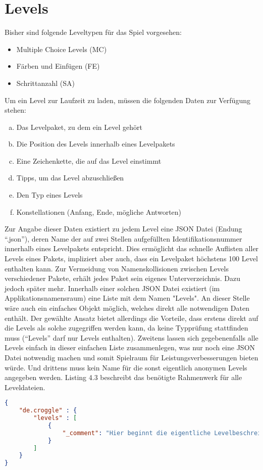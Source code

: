 \section{Levels}
Bisher sind folgende Leveltypen für das Spiel vorgesehen:
\begin{itemize}
	\item Multiple Choice Levels (MC)
	\item Färben und Einfügen (FE)
	\item Schrittanzahl (SA)
\end{itemize}
Um ein Level zur Laufzeit zu laden, müssen die folgenden Daten zur Verfügung stehen:
\begin{enumerate}[a)]
	\item Das Levelpaket, zu dem ein Level gehört
	\item Die Position des Levels innerhalb eines Levelpakets
	\item Eine Zeichenkette, die auf das Level einstimmt
	\item Tipps, um das Level abzuschließen
	\item Den Typ eines Levels
	\item Konstellationen (Anfang, Ende, mögliche Antworten)
\end{enumerate}
Zur Angabe dieser Daten existiert zu jedem Level eine JSON Datei (Endung "`.json"'), deren Name der auf zwei Stellen aufgefüllten Identifikationsnummer innerhalb eines Levelpakets entspricht.
Dies ermöglicht das schnelle Auflisten aller Levels eines Pakets, impliziert aber auch, dass ein Levelpaket höchstens 100 Level enthalten kann.
Zur Vermeidung von Namenskollisionen zwischen Levels verschiedener Pakete, erhält jedes Paket sein eigenes Unterverzeichnis.
Dazu jedoch später mehr.
Innerhalb einer solchen JSON Datei existiert (im Applikationsnamensraum) eine Liste mit dem Namen "Levels".
An dieser Stelle wäre auch ein einfaches Objekt möglich, welches direkt alle notwendigen Daten enthält.
Der gewählte Ansatz bietet allerdings die Vorteile, dass erstens direkt auf die Levels als solche zugegriffen werden kann, da keine Typprüfung stattfinden muss ("`Levels"' darf nur Levels enthalten).
Zweitens lassen sich gegebenenfalls alle Levels einfach in dieser einfachen Liste zusammenlegen, was nur noch eine JSON Datei notwendig machen und somit Spielraum für Leistungsverbesserungen bieten würde.
Und drittens muss kein Name für die sonst eigentlich anonymen Levels angegeben werden.
Listing 4.3 beschreibt das benötigte Rahmenwerk für alle Leveldateien.
\begin{lstlisting}[language=json,caption={JSON Leveldatei, z.B. json/00/00.json}]
{
	"de.croggle" : {
		"levels" : [
			{
				"_comment": "Hier beginnt die eigentliche Levelbeschreibung von Levelpaket 1/ Level 1"
			}
		]
	}
}
\end{lstlisting}

